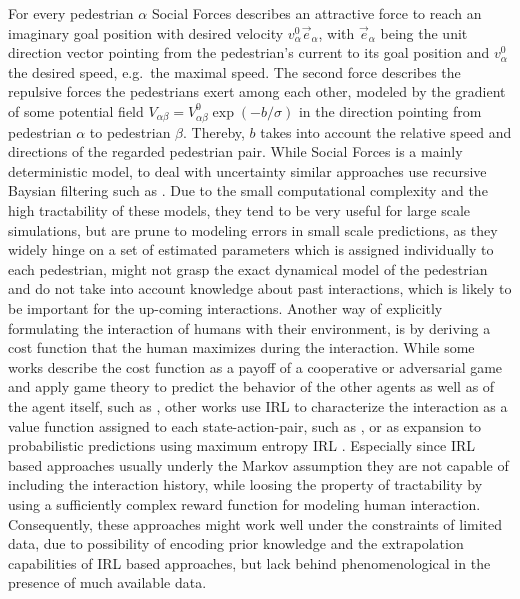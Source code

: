 For every pedestrian $\alpha$ Social Forces describes an attractive force to reach an imaginary goal position with desired velocity $v^0_{\alpha} \vec{e}_{\alpha}$, with $\vec{e}_{\alpha}$ being the unit direction vector pointing from the pedestrian's current to its goal position and $v^0_{\alpha}$ the desired speed, e.g.\ the maximal speed. The second force describes the repulsive forces the pedestrians exert among each other, modeled by the gradient of some potential field $V_{\alpha \beta} = V_{\alpha \beta}^0 \exp(-b / \sigma)$ in the direction pointing from pedestrian $\alpha$ to pedestrian $\beta$. Thereby, $b$ takes into account the relative speed and directions of the regarded pedestrian pair. While Social Forces is a mainly deterministic model, to deal with uncertainty similar approaches use recursive Baysian filtering such as \cite{Schneider2013}\cite{Rehder2015}\cite{Guo2016}. Due to the small computational complexity and the high tractability of these models, they tend to be very useful for large scale simulations, but are prune to modeling errors in small scale predictions, as they widely hinge on a set of estimated parameters which is assigned individually to each pedestrian, might not grasp the exact dynamical model of the pedestrian and do not take into account knowledge about past interactions, which is likely to be important for the up-coming interactions.
\newline
Another way of explicitly formulating the interaction of humans with their environment, is by deriving a cost function that the human maximizes during the interaction. While some works describe the cost function as a payoff of a cooperative or adversarial game and apply game theory to predict the behavior of the other agents as well as of the agent itself, such as \cite{Bouzat2014}\cite{Nikolaidis2017}, other works use \ac{IRL} \cite{Ng2000} to characterize the interaction as a value function assigned to each state-action-pair, such as \cite{Fahad2018}\cite{Fernando2019}\cite{Saleh2018}, or as expansion to probabilistic predictions using maximum entropy \ac{IRL} \cite{Ziebart2008}. Especially since \ac{IRL} based approaches usually underly the Markov assumption they are not capable of including the interaction history, while loosing the property of tractability by using a sufficiently complex reward function for modeling human interaction. Consequently, these approaches might work well under the constraints of limited data, due to possibility of encoding prior knowledge and the extrapolation capabilities of \ac{IRL} based approaches, but lack behind phenomenological in the presence of much available data.

